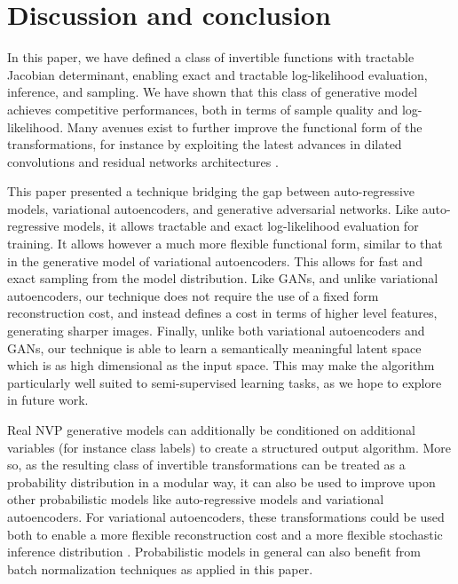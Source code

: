 \documentclass{article}
\begin{document}
\section{Discussion and conclusion}
In this paper, we have defined a class of invertible functions with tractable Jacobian determinant, enabling exact and tractable log-likelihood evaluation, inference, and sampling.
We have shown that this class of generative model achieves competitive performances, both in terms of sample quality and log-likelihood.
Many avenues exist to further improve the functional form of the transformations, for instance by exploiting the latest advances in dilated convolutions \citep{yu2015multi} and residual networks architectures \citep{DBLP:journals/corr/TargAL16}.

This paper presented a technique bridging the gap between auto-regressive models, variational autoencoders, and generative adversarial networks. Like auto-regressive models, it allows tractable and exact log-likelihood evaluation for training. It allows however a much more flexible functional form, similar to that in the generative model of variational autoencoders. This allows for fast and exact sampling from the model distribution.
Like GANs, and unlike variational autoencoders, our technique does not require the use of a fixed form reconstruction cost, and instead defines a cost in terms of higher level features, generating sharper images.
Finally, unlike both variational autoencoders and GANs, our technique is able to learn a semantically meaningful latent space which is as high dimensional as the input space. This may make the algorithm particularly well suited to semi-supervised learning tasks, as we hope to explore in future work.

Real NVP generative models can additionally be conditioned on additional variables (for instance class labels) to create a structured output algorithm. More so, as the resulting class of invertible transformations can be treated as a probability distribution in a modular way, it can also be used to improve upon other probabilistic models like auto-regressive models and variational autoencoders. For variational autoencoders, these transformations could be used both to enable a more flexible reconstruction cost  \citep{DBLP:journals/corr/LarsenSW15} and a more flexible stochastic inference distribution \citep{ rezende2015variational}. Probabilistic models in general can also benefit from batch normalization techniques as applied in this paper.
\end{document}
